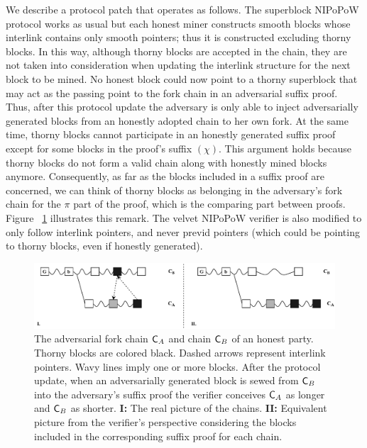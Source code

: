 We describe a protocol patch that operates as follows. The superblock NIPoPoW protocol works as usual but each honest miner constructs smooth blocks whose interlink contains only smooth pointers; thus it is constructed excluding thorny blocks. In this way, although thorny blocks are accepted in the chain, they are not taken into consideration when updating the interlink structure for the next block to be mined. No honest block could now point to a thorny superblock that may act as the passing point to the fork chain in an adversarial suffix proof. Thus, after this protocol update the adversary is only able to inject adversarially generated blocks from an honestly adopted chain to her own fork.
At the same time, thorny blocks cannot participate in an honestly generated suffix proof except for some blocks in the proof's suffix $(\chi)$. This argument holds because thorny blocks do not form a valid chain along with honestly mined blocks anymore. Consequently, as far as the blocks included in a suffix proof are concerned, we can think of thorny blocks as belonging in the adversary's fork chain for the $\pi$ part of the proof,  which is the comparing part between proofs. Figure~
\ref{fig:injection} illustrates this remark. The velvet NIPoPoW verifier is also modified to only follow interlink pointers, and never previd pointers (which could be pointing to thorny blocks, even if honestly generated).

\begin{figure}[h!]
	\begin{center}
		\includegraphics[width=\textwidth]{figures/injection.pdf}
	\end{center}
	\caption{The adversarial fork chain $\mathsf{C}_A$ and chain $\mathsf{C}_B$ of an honest party. Thorny blocks are colored black. Dashed arrows represent interlink pointers. Wavy lines imply one or more blocks. After the protocol update, when an adversarially generated block is sewed from $\mathsf{C}_B$ into the adversary's suffix proof the verifier conceives $\mathsf{C}_A$ as longer and $\mathsf{C}_B$ as shorter. \textbf{I:} The real picture of the chains. \textbf{II:} Equivalent picture from the verifier's perspective considering the blocks included in the corresponding suffix proof for each chain.}
	\label{fig:injection}
\end{figure}

